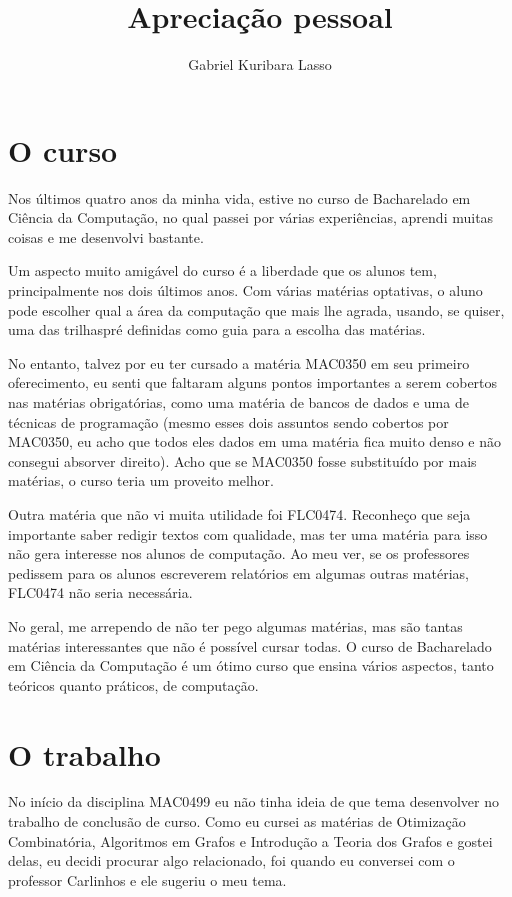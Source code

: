 \documentclass{article}
\title{Apreciação pessoal}
\author{Gabriel Kuribara Lasso}
\date{}
\begin{document}
\maketitle
\section*{O curso}
Nos últimos quatro anos da minha vida, estive no curso de Bacharelado em Ciência da Computação, no qual passei por várias experiências, aprendi muitas coisas e me desenvolvi bastante.

Um aspecto muito amigável do curso é a liberdade que os alunos tem, principalmente nos dois últimos anos. Com várias matérias optativas, o aluno pode escolher qual a área da computação que mais lhe agrada, usando, se quiser, uma das trilhaspré definidas como guia para a escolha das matérias.

No entanto, talvez por eu ter cursado a matéria MAC0350 em seu primeiro oferecimento, eu senti que faltaram alguns pontos importantes a serem cobertos nas matérias obrigatórias, como uma matéria de bancos de dados e uma de técnicas de programação (mesmo esses dois assuntos sendo cobertos por MAC0350, eu acho que todos eles dados em uma matéria fica muito denso e não consegui absorver direito). Acho que se MAC0350 fosse substituído por mais matérias, o curso teria um proveito melhor.

Outra matéria que não vi muita utilidade foi FLC0474. Reconheço que seja importante saber redigir textos com qualidade, mas ter uma matéria para isso não gera interesse nos alunos de computação. Ao meu ver, se os professores pedissem para os alunos escreverem relatórios em algumas outras matérias, FLC0474 não seria necessária.

No geral, me arrependo de não ter pego algumas matérias, mas são tantas matérias interessantes que não é possível cursar todas. O curso de Bacharelado em Ciência da Computação é um ótimo curso que ensina vários aspectos, tanto teóricos quanto práticos, de computação.

\section*{O trabalho}
No início da disciplina MAC0499 eu não tinha ideia de que tema desenvolver no trabalho de conclusão de curso. Como eu cursei as matérias de Otimização Combinatória, Algoritmos em Grafos e Introdução a Teoria dos Grafos e gostei delas, eu decidi procurar algo relacionado, foi quando eu conversei com o professor Carlinhos e ele sugeriu o meu tema.
\end{document}

